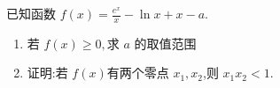 \documentclass[class=ctexart,crop=false]{standalone}
\begin{document}
已知函数 $f(x)=\frac{e^x}{x}-\ln{x}+x-a$.
\begin{enumerate}[label=(\arabic*)]
    \item 若 $f(x)\geqslant 0,$求 $a$ 的取值范围
    \item 证明:若 $f(x)$有两个零点 $x_1,x_2$,则 $x_1x_2<1$.
\end{enumerate}
\end{document}
